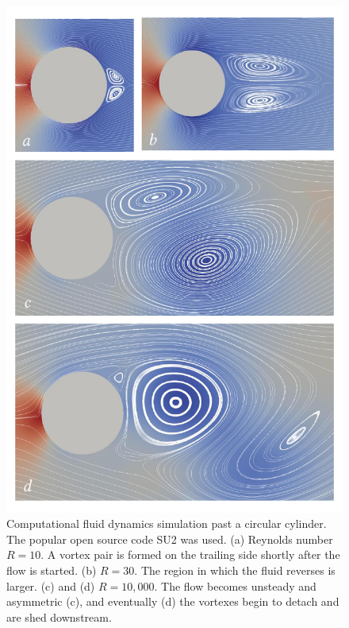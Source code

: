 \begin{figure}
\centering\includegraphics[width=0.9\linewidth]{Figures/Chapter4/fig_vortex_shedding}
\caption{Computational fluid dynamics simulation past a circular cylinder.  The popular open source code SU2 was used.  (a) Reynolds number $R = 10$.  A vortex pair is formed on the trailing side shortly after the flow is started.  (b) $R = 30$.  The region in which the fluid reverses is larger.  (c) and (d) $R = 10,000$.  The flow becomes unsteady and asymmetric (c), and eventually (d) the vortexes begin to detach and are shed downstream.}
\label{fig_vortex_shedding}
\end{figure}

